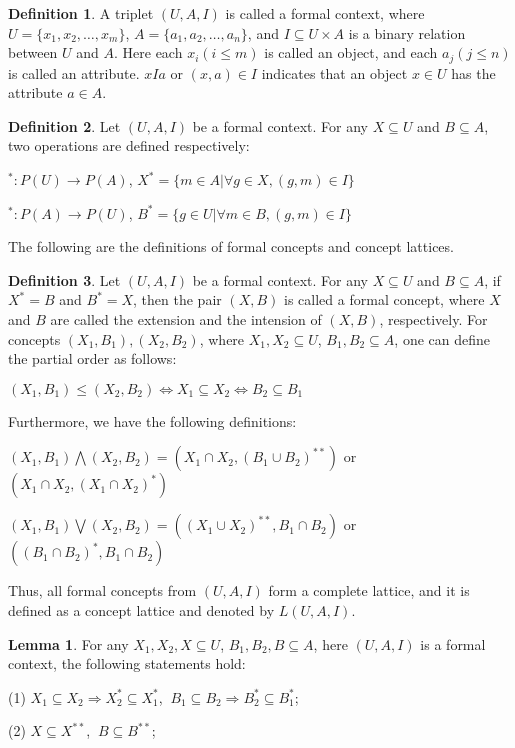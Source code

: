 \documentclass[11pt]{article}
\numberwithin{equation}{subsection}
\begin{document}
\textbf{Definition 1}. \cite{Ganter} A triplet  $(U, A, I)$ is called a formal context, where $U =\{x_1, x_2, \ldots , x_m\}$, $A=\{a_1, a_2, \ldots , a_n\}$, and $I \subseteq U\times A$ is a binary relation between $U$ and  $A$. Here each $x_i(i\leq m)$ is called an object, and each $a_j(j \leq n)$ is called an attribute.  $xIa$ or $(x, a) \in I$ indicates that an object $x\in U$ has the
attribute $a\in A$.

\textbf{Definition 2}. \cite{Ganter} Let $(U, A, I)$ be a formal context. For any $X \subseteq U$ and $B \subseteq A$, two operations are defined respectively:


$^* : P(U)\rightarrow P(A)$, $X^* = \{m \in A|\forall g \in X, (g,m) \in I\}$

$^* : P(A)\rightarrow P(U)$, $B^* = \{g \in U | \forall m \in B, (g,m) \in I\}$

The following are the definitions of formal concepts and concept lattices.

\textbf{Definition 3}. \cite{Ganter} Let $(U, A, I)$ be a formal context. For any $X \subseteq U$ and $B \subseteq A$, if $X^*=B$ and $B^*=X$, then the pair $(X, B)$   is called a formal concept, where $X$ and $B$
are called the extension and the intension of $(X, B)$,
respectively.
For concepts $(X_1, B_1), (X_2, B_2)$, where $X_1, X_2 \subseteq U$, $ B_1, B_2 \subseteq A$, one can define the partial order as follows:

$(X_1, B_1) \leq (X_2, B_2) \Leftrightarrow X_1 \subseteq X_2\Leftrightarrow B_2 \subseteq B_1$

Furthermore, we have the following definitions:

$(X_1, B_1) \bigwedge (X_2, B_2) = (X_1 \cap X_2, (B_1 \cup B_2)^{**})$ or  $(X_1 \cap X_2, (X_1 \cap X_2)^{*})$

$(X_1, B_1) \bigvee (X_2, B_2) = ((X_1 \cup X_2)^{**}, B_1 \cap B_2)$ or  $((B_1 \cap B_2)^{*}, B_1 \cap B_2)$

Thus, all formal concepts from $(U, A, I)$ form a complete lattice, and it is defined as a concept lattice and denoted by $L(U, A, I)$.

\textbf{ Lemma 1}. \cite{Ganter}
 For any $X_1, X_2, X \subseteq U$, $ B_1, B_2, B \subseteq A$, here $(U, A, I)$ is a formal context, the following statements hold:

(1) $X_1\subseteq X_2 \Rightarrow X^*_2 \subseteq X^*_1$, $\ B_1\subseteq B_2 \Rightarrow B^*_2\subseteq B^*_1$;

(2) $X \subseteq X^{**}$, $\ B \subseteq B^{**}$;
\end{document}
